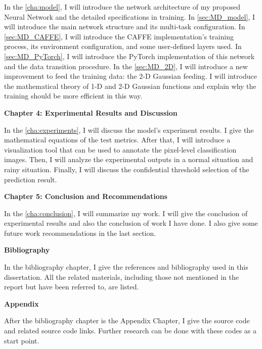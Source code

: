 \begin{spacing}{1.5}
In the \autoref{cha:model}, I will introduce the network architecture of my proposed Neural Network and the detailed specifications in training. In \autoref{sec:MD_model}, I will introduce the main network structure and its multi-task configuration. In \autoref{sec:MD_CAFFE}, I will introduce the CAFFE implementation's training process, its environment configuration, and some user-defined layers used. In \autoref{sec:MD_PyTorch}, I will introduce the PyTorch implementation of this network and the data transition procedure. In the \autoref{sec:MD_2D}, I will introduce a new improvement to feed the training data: the 2-D Gaussian feeding. I will introduce the mathematical theory of 1-D and 2-D Gaussian functions and explain why the training should be more efficient in this way.

{\large\textbf{Chapter 4: Experimental Results and Discussion}}

In the \autoref{cha:experiments}, I will discuss the model's experiment results. I give the mathematical equations of the test metrics. After that, I will introduce a visualization tool that can be used to annotate the pixel-level classification images. Then, I will analyze the experimental outputs in a normal situation and rainy situation. Finally, I will discuss the confidential threshold selection of the prediction result.

{\large\textbf{Chapter 5: Conclusion and Recommendations}}

In the \autoref{cha:conclusion}, I will summarize my work. I will give the conclusion of experimental results and also the conclusion of work I have done. I also give some future work recommendations in the last section.

{\large\textbf{Bibliography}}

In the bibliography chapter, I give the references and bibliography used in this dissertation. All the related materials, including those not mentioned in the report but have been referred to, are listed.

{\large\textbf{Appendix}}

After the bibliography chapter is the Appendix Chapter, I give the source code and related source code links. Further research can be done with these codes as a start point.

\end{spacing}
\newpage


